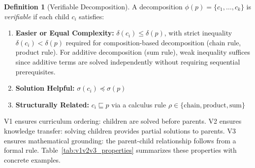 \documentclass[a4paper,fleqn]{cas-dc}
\theoremstyle{definition}
\newtheorem{definition}{Definition}
\begin{document}
\begin{definition}[Verifiable Decomposition]
\label{def:verifiable}
A decomposition $\phi(p) = \{c_1, \ldots, c_k\}$ is \emph{verifiable} if each child $c_i$ satisfies:
\begin{enumerate}[label=\textbf{V\arabic*}:, leftmargin=2.5em]
    \item \textbf{Easier or Equal Complexity:} $\delta(c_i) \leq \delta(p)$, with strict inequality $\delta(c_i) < \delta(p)$ required for composition-based decomposition (chain rule, product rule). For additive decomposition (sum rule), weak inequality suffices since additive terms are solved independently without requiring sequential prerequisites.
    \item \textbf{Solution Helpful:} $\sigma(c_i) \preceq \sigma(p)$
    \item \textbf{Structurally Related:} $c_i \sqsubseteq p$ via a calculus rule $\rho \in \{\text{chain}, \text{product}, \text{sum}\}$
\end{enumerate}
\end{definition}
\noindent
V1 ensures curriculum ordering: children are solved before parents. V2 ensures knowledge transfer: solving children provides partial solutions to parents. V3 ensures mathematical grounding: the parent-child relationship follows from a formal rule. Table~\ref{tab:v1v2v3_properties} summarizes these properties with concrete examples.
\end{document}
